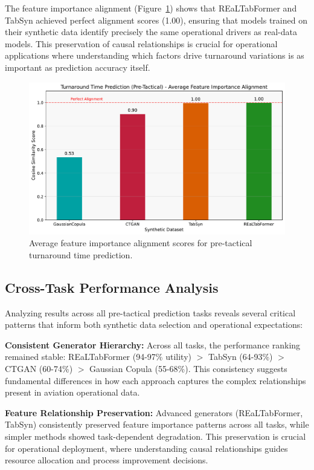 \documentclass[conference]{IEEEtran}
\begin{document}
The feature importance alignment (Figure~\ref{fig:turnaround_pre_alignment}) shows that  REaLTabFormer and TabSyn achieved perfect alignment scores (1.00), ensuring that models trained on their synthetic data identify precisely the same operational drivers as real-data models. This preservation of causal relationships is crucial for operational applications where understanding which factors drive turnaround variations is as important as prediction accuracy itself.

\begin{figure}[htbp]
    \centering
    \includegraphics[width=0.8\linewidth]{plots/turnaround_min_pre-tactical/turnaround_min_pre-tactical_avg_alignment_score.pdf}
    \caption{Average feature importance alignment scores for pre-tactical turnaround time prediction.}
    \label{fig:turnaround_pre_alignment}
\end{figure}

\subsection{Cross-Task Performance Analysis}

Analyzing results across all pre-tactical prediction tasks reveals several critical patterns that inform both synthetic data selection and operational expectations:

\textbf{Consistent Generator Hierarchy:} Across all tasks, the performance ranking remained stable: REaLTabFormer (94-97\% utility) $>$ TabSyn (64-93\%) $>$ CTGAN (60-74\%) $>$ Gaussian Copula (55-68\%). This consistency suggests fundamental differences in how each approach captures the complex relationships present in aviation operational data.


\textbf{Feature Relationship Preservation:} Advanced generators (REaLTabFormer, TabSyn) consistently preserved feature importance patterns across all tasks, while simpler methods showed task-dependent degradation. This preservation is crucial for operational deployment, where understanding causal relationships guides resource allocation and process improvement decisions.
\end{document}
